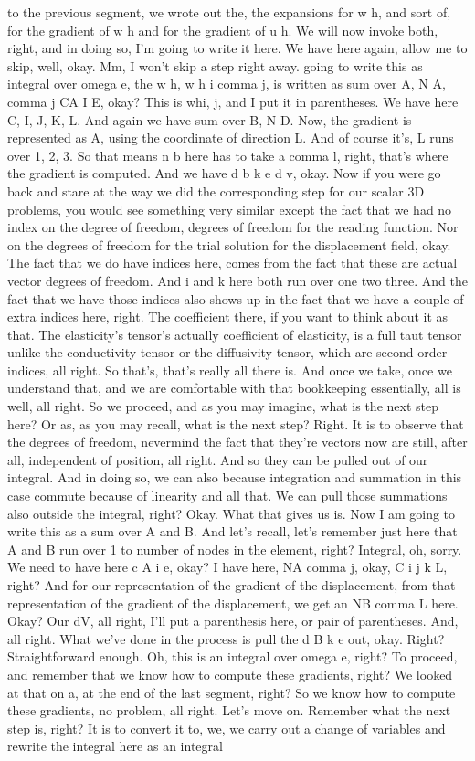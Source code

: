 \documentclass[10pt]{article}
\begin{document}
to the previous segment, we wrote out the, the expansions for w h, and sort of, for the gradient of w h and for the gradient of u h. We will now invoke both, right, and in doing so, I'm going to write it here. We have here again, allow me to skip, well, okay. Mm, I won't skip a step right away. going to write this as integral over omega e, the w h, w h i comma j, is written as sum over A, N A, comma j CA I E, okay? This is whi, j, and I put it in parentheses. We have here C, I, J, K, L. And again we have sum over B, N D. Now, the gradient is represented as A, using the coordinate of direction L. And of course it's, L runs over 1, 2, 3. So that means n b here has to take a comma l, right, that's where the gradient is computed. And we have d b k e d v, okay. Now if you were go back and stare at the way we did the corresponding step for our scalar 3D problems, you would see something very similar except the fact that we had no index on the degree of freedom, degrees of freedom for the reading function. Nor on the degrees of freedom for the trial solution for the displacement field, okay. The fact that we do have indices here, comes from the fact that these are actual vector degrees of freedom. And i and k here both run over one two three. And the fact that we have those indices also shows up in the fact that we have a couple of extra indices here, right. The coefficient there, if you want to think about it as that. The elasticity's tensor's actually coefficient of elasticity, is a full taut tensor unlike the conductivity tensor or the diffusivity tensor, which are second order indices, all right. So that's, that's really all there is. And once we take, once we understand that, and we are comfortable with that bookkeeping essentially, all is well, all right. So we proceed, and as you may imagine, what is the next step here? Or as, as you may recall, what is the next step? Right. It is to observe that the degrees of freedom, nevermind the fact that they're vectors now are still, after all, independent of position, all right. And so they can be pulled out of our integral. And in doing so, we can also because integration and summation in this case commute because of linearity and all that. We can pull those summations also outside the integral, right? Okay. What that gives us is. Now I am going to write this as a sum over A and B. And let's recall, let's remember just here that A and B run over 1 to number of nodes in the element, right? Integral, oh, sorry. We need to have here c A i e, okay? I have here, NA comma j, okay, C i j k L, right? And for our representation of the gradient of the displacement, from that representation of the gradient of the displacement, we get an NB comma L here. Okay? Our dV, all right, I'll put a parenthesis here, or pair of parentheses. And, all right. What we've done in the process is pull the d B k e out, okay. Right? Straightforward enough. Oh, this is an integral over omega e, right? To proceed, and remember that we know how to compute these gradients, right? We looked at that on a, at the end of the last segment, right? So we know how to compute these gradients, no problem, all right. Let's move on. Remember what the next step is, right? It is to convert it to, we, we carry out a change of variables and rewrite the integral here as an integral 
\end{document}
